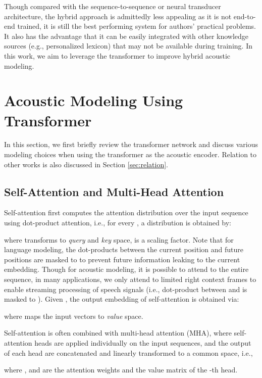 \documentclass{article}
\begin{document}
Though compared with the sequence-to-sequence or neural transducer architecture, the hybrid approach is admittedly less appealing as it is 
not end-to-end trained, it is still the best performing system for authors' practical problems. It also has the advantage that it can be easily integrated with other knowledge sources (e.g., personalized lexicon) that may not be available during training. In this work, we aim to leverage the transformer to improve hybrid acoustic modeling.

\section{Acoustic Modeling Using Transformer}
\label{sec:am}
In this section, we first briefly review the transformer network and discuss various modeling choices when using the transformer as the acoustic encoder. Relation to other works is also discussed in Section \ref{sec:relation}.





\subsection{Self-Attention and Multi-Head Attention}
Self-attention first computes the attention distribution over the input sequence using dot-product attention, i.e., for every , a distribution  is obtained by: 

where  transforms  to 
\emph{query} and \emph{key} space,  is a scaling factor. Note that for language modeling, the dot-products between the current position and future positions are masked to  to prevent future information leaking to the current embedding. Though for acoustic modeling, it is possible to attend to the entire sequence, in many applications, we only attend to limited right context frames to enable streaming processing of speech signals (i.e., dot-product between  and  is masked to ). Given , the output embedding of self-attention is obtained via:

where  maps the input vectors to \emph{value} space.

Self-attention is often combined with multi-head attention (MHA), where  self-attention heads are applied individually on the input sequences, and the output of each head are concatenated and linearly transformed to a common space, i.e., 

where ,  and  are the attention weights and the value matrix of the -th head. 
\end{document}
